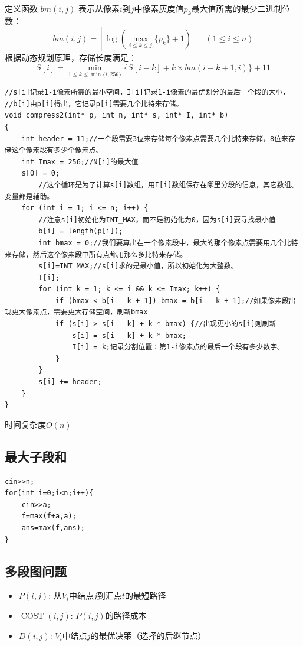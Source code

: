 \documentclass[./../main.tex]{subfiles}
\begin{document}
定义函数 $bm(i,j)$ 表示从像素$i$到$j$中像素灰度值$p_k$最大值所需的最少二进制位数：
\begin{equation*}
bm(i,j) = \left\lceil\log \left(\max_{i \leq k \leq j}\{p_k\} + 1\right)\right\rceil \quad (1 \leq i \leq n)
\end{equation*}
根据动态规划原理，存储长度满足：
\begin{equation}
S[i] = \min_{1 \leq k \leq \min\{i, 256\}} \Big\{ S[i-k] + k \times bm(i-k+1,i)\Big\} + 11
\end{equation}
\begin{lstlisting}
//s[i]记录1-i像素所需的最小空间，I[i]记录1-i像素的最优划分的最后一个段的大小，
//b[i]由p[i]得出，它记录p[i]需要几个比特来存储。
void compress2(int* p, int n, int* s, int* I, int* b)
{
	int header = 11;//一个段需要3位来存储每个像素点需要几个比特来存储，8位来存储这个像素段有多少个像素点。
	int Imax = 256;//N[i]的最大值
	s[0] = 0;
        //这个循环是为了计算s[i]数组，用I[i]数组保存在哪里分段的信息，其它数组、变量都是辅助。
	for (int i = 1; i <= n; i++) {
		//注意s[i]初始化为INT_MAX，而不是初始化为0，因为s[i]要寻找最小值
		b[i] = length(p[i]);
		int bmax = 0;//我们要算出在一个像素段中，最大的那个像素点需要用几个比特来存储，然后这个像素段中所有点都用那么多比特来存储。
		s[i]=INT_MAX;//s[i]求的是最小值，所以初始化为大整数。
		I[i];
		for (int k = 1; k <= i && k <= Imax; k++) {
			if (bmax < b[i - k + 1]) bmax = b[i - k + 1];//如果像素段出现更大像素点，需要更大存储空间，刷新bmax
			if (s[i] > s[i - k] + k * bmax) {//出现更小的s[i]则刷新
				s[i] = s[i - k] + k * bmax;
				I[i] = k;记录分割位置：第1-i像素点的最后一个段有多少数字。
			}
		}
		s[i] += header;
	}
}
\end{lstlisting}

时间复杂度$O(n)$

\subsection{最大子段和}
\begin{lstlisting}
cin>>n;
for(int i=0;i<n;i++){
    cin>>a;
    f=max(f+a,a);
    ans=max(f,ans);
}
\end{lstlisting}
\subsection{多段图问题}
\begin{itemize}
    \item $P(i,j)$: 从$V_i$中结点$j$到汇点$t$的最短路径
    \item $\operatorname{COST}(i,j)$: $P(i,j)$的路径成本
    \item $D(i,j)$: $V_i$中结点$j$的最优决策（选择的后继节点）
\end{itemize}
\end{document}
